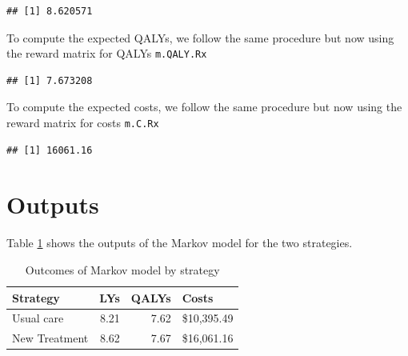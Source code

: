 \documentclass[]{article}
\newenvironment{Shaded}{\begin{snugshade}}{\end{snugshade}}
\newcommand{\KeywordTok}[1]{\textcolor[rgb]{0.13,0.29,0.53}{\textbf{#1}}}
\newcommand{\DataTypeTok}[1]{\textcolor[rgb]{0.13,0.29,0.53}{#1}}
\newcommand{\StringTok}[1]{\textcolor[rgb]{0.31,0.60,0.02}{#1}}
\newcommand{\OtherTok}[1]{\textcolor[rgb]{0.56,0.35,0.01}{#1}}
\newcommand{\OperatorTok}[1]{\textcolor[rgb]{0.81,0.36,0.00}{\textbf{#1}}}
\newcommand{\NormalTok}[1]{#1}
\theoremstyle{definition}
\theoremstyle{definition}
\theoremstyle{definition}
\theoremstyle{remark}
\begin{document}
\begin{verbatim}
## [1] 8.620571
\end{verbatim}

To compute the expected QALYs, we follow the same procedure but now
using the reward matrix for QALYs \texttt{m.QALY.Rx}

\begin{Shaded}
\end{Shaded}

\begin{verbatim}
## [1] 7.673208
\end{verbatim}

To compute the expected costs, we follow the same procedure but now
using the reward matrix for costs \texttt{m.C.Rx}

\begin{Shaded}
\end{Shaded}

\begin{verbatim}
## [1] 16061.16
\end{verbatim}

\section{Outputs}\label{outputs}

Table \ref{tab:Output} shows the outputs of the Markov model for the two
strategies.

\begin{table}[!h]

\caption{\label{tab:Output}Outcomes of Markov model by strategy}
\centering
\begin{tabular}[t]{lrrl}
\toprule
Strategy & LYs & QALYs & Costs\\
\midrule
Usual care & 8.21 & 7.62 & \$10,395.49\\
New Treatment & 8.62 & 7.67 & \$16,061.16\\
\bottomrule
\end{tabular}
\end{table}
\end{document}
